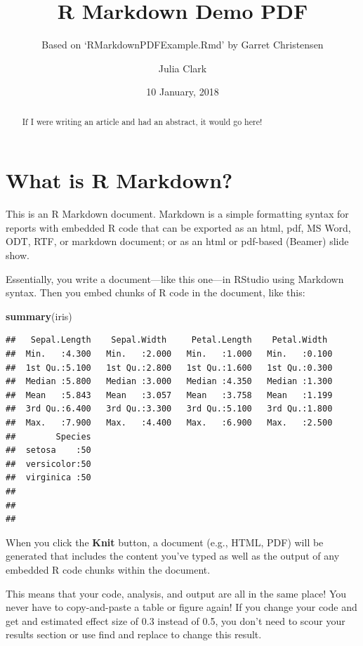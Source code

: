 \documentclass[11pt,]{article}
\title{R Markdown Demo PDF}
\subtitle{Based on `RMarkdownPDFExample.Rmd' by Garret Christensen}
\author{Julia Clark}
\date{10 January, 2018}
\newenvironment{Shaded}{\begin{snugshade}}{\end{snugshade}}
\newcommand{\KeywordTok}[1]{\textcolor[rgb]{0.13,0.29,0.53}{\textbf{#1}}}
\newcommand{\NormalTok}[1]{#1}
\begin{document}
\maketitle
\begin{abstract}
If I were writing an article and had an abstract, it would go here!
\end{abstract}

\section{What is R Markdown?}\label{what-is-r-markdown}

This is an R Markdown document. Markdown is a simple formatting syntax
for reports with embedded R code that can be exported as an html, pdf,
MS Word, ODT, RTF, or markdown document; or as an html or pdf-based
(Beamer) slide show.

Essentially, you write a document---like this one---in RStudio using
Markdown syntax. Then you embed chunks of R code in the document, like
this:

\begin{Shaded}
\begin{Highlighting}[]
\KeywordTok{summary}\NormalTok{(iris)}
\end{Highlighting}
\end{Shaded}

\begin{verbatim}
##   Sepal.Length    Sepal.Width     Petal.Length    Petal.Width   
##  Min.   :4.300   Min.   :2.000   Min.   :1.000   Min.   :0.100  
##  1st Qu.:5.100   1st Qu.:2.800   1st Qu.:1.600   1st Qu.:0.300  
##  Median :5.800   Median :3.000   Median :4.350   Median :1.300  
##  Mean   :5.843   Mean   :3.057   Mean   :3.758   Mean   :1.199  
##  3rd Qu.:6.400   3rd Qu.:3.300   3rd Qu.:5.100   3rd Qu.:1.800  
##  Max.   :7.900   Max.   :4.400   Max.   :6.900   Max.   :2.500  
##        Species  
##  setosa    :50  
##  versicolor:50  
##  virginica :50  
##                 
##                 
## 
\end{verbatim}

When you click the \textbf{Knit} button, a document (e.g., HTML, PDF)
will be generated that includes the content you've typed as well as the
output of any embedded R code chunks within the document.

This means that your code, analysis, and output are all in the same
place! You never have to copy-and-paste a table or figure again! If you
change your code and get and estimated effect size of 0.3 instead of
0.5, you don't need to scour your results section or use find and
replace to change this result.
\end{document}
